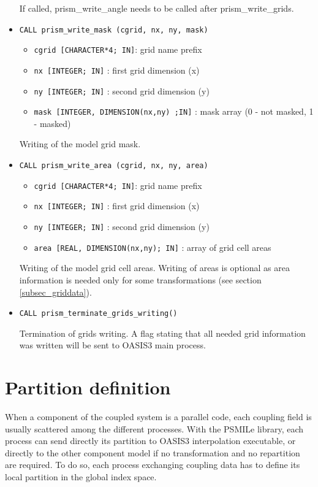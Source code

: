 \begin{itemize}
 If called,
 prism\_write\_angle needs to be called after prism\_write\_grids.

\item {\tt CALL prism\_write\_mask (cgrid, nx, ny, mask)}
 \begin{itemize}
    \item {\tt cgrid [CHARACTER*4; IN]}: grid name prefix 
    \item {\tt nx [INTEGER; IN]} : first grid dimension (x)
    \item {\tt ny [INTEGER; IN]} : second grid dimension (y)
    \item {\tt mask [INTEGER, DIMENSION(nx,ny) ;IN]} : mask array (0 - not masked, 1 - masked)
 \end{itemize}
Writing of the model grid mask.

\item {\tt CALL prism\_write\_area (cgrid, nx, ny, area)}
 \begin{itemize}
    \item {\tt cgrid [CHARACTER*4; IN]}: grid name prefix
    \item {\tt nx [INTEGER; IN]} : first grid dimension (x)
    \item {\tt ny [INTEGER; IN]} : second grid dimension (y)
    \item {\tt area [REAL, DIMENSION(nx,ny); IN]} : array of grid cell areas
 \end{itemize}
Writing of the model grid cell areas. Writing of areas is optional as
area information is needed only for some transformations (see section
\ref{subsec_griddata}).

\item {\tt CALL prism\_terminate\_grids\_writing()}

Termination of grids writing. A flag stating that all needed grid
information was written will be sent to OASIS3 main process.

\end{itemize}

\section{Partition definition}
\label{subsubsec_Partition}

When a component of the coupled system is a parallel code, each
coupling field is usually scattered among the different
processes. With the PSMILe library, each process can send
directly its partition to OASIS3 interpolation executable, or directly to the
other component model if no transformation and no repartition are
required.  To do so, each process exchanging coupling data has to
define its local partition in the global index space.

